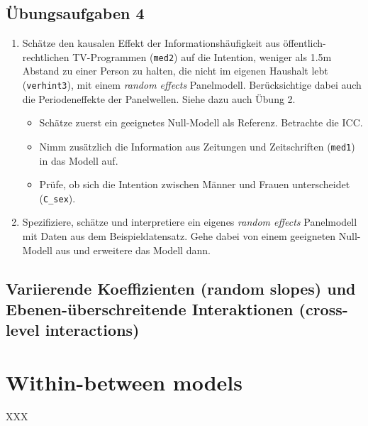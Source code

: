 \documentclass[
]{book}
\providecommand{\tightlist}{%
  \setlength{\itemsep}{0pt}\setlength{\parskip}{0pt}}
\begin{document}
\hypertarget{uxfcbungsaufgaben-4}{%
\section{Übungsaufgaben 4}\label{uxfcbungsaufgaben-4}}

\begin{enumerate}
\def\labelenumi{\arabic{enumi})}
\tightlist
\item
  Schätze den kausalen Effekt der Informationshäufigkeit aus öffentlich-rechtlichen TV-Programmen (\texttt{med2}) auf die Intention, weniger als 1.5m Abstand zu einer Person zu halten, die nicht im eigenen Haushalt lebt (\texttt{verhint3}), mit einem \emph{random effects} Panelmodell. Berücksichtige dabei auch die Periodeneffekte der Panelwellen. Siehe dazu auch Übung 2.

  \begin{itemize}
  \tightlist
  \item
    Schätze zuerst ein geeignetes Null-Modell als Referenz. Betrachte die ICC.
  \item
    Nimm zusätzlich die Information aus Zeitungen und Zeitschriften (\texttt{med1}) in das Modell auf.
  \item
    Prüfe, ob sich die Intention zwischen Männer und Frauen unterscheidet (\texttt{C\_sex}).
  \end{itemize}
\item
  Spezifiziere, schätze und interpretiere ein eigenes \emph{random effects} Panelmodell mit Daten aus dem Beispieldatensatz. Gehe dabei von einem geeigneten Null-Modell aus und erweitere das Modell dann.
\end{enumerate}

\hypertarget{variierende-koeffizienten-random-slopes-und-ebenen-uxfcberschreitende-interaktionen-cross-level-interactions}{%
\section{Variierende Koeffizienten (random slopes) und Ebenen-überschreitende Interaktionen (cross-level interactions)}\label{variierende-koeffizienten-random-slopes-und-ebenen-uxfcberschreitende-interaktionen-cross-level-interactions}}

\hypertarget{within-between-models}{%
\chapter{Within-between models}\label{within-between-models}}

XXX

  
\end{document}
